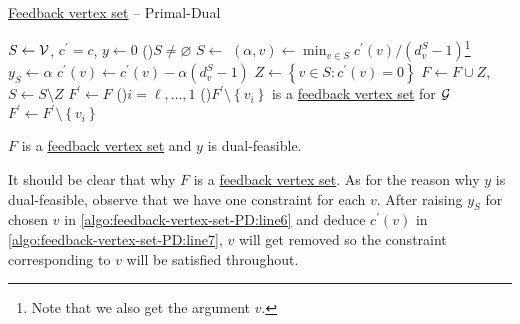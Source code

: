 \begin{algorithm}[H]\label{algo:feedback-vertex-set-PD}
	\DontPrintSemicolon
	\caption{\hyperref[prb:feedback-vertex-set]{Feedback vertex set} -- Primal-Dual}
	\BlankLine

	\(S\gets \mathcal{\MakeUppercase{v}} \), \(c^\prime = c\), \(y\gets 0\)
	\;
	\While(){\(S \neq \varnothing \)}{
		\(S\gets\) 
		\((\alpha, v) \gets \min _{v\in S} c^\prime (v) / (d_v^S - 1)\)\footnote{Note that we also get the argument \(v\).}
		\(y_S\gets \alpha\)\label{algo:feedback-vertex-set-PD:line6}\;
		\(c^\prime (v)\gets c^\prime (v) - \alpha (d_v^S - 1)\)\label{algo:feedback-vertex-set-PD:line7}\;
		\(Z\gets \left\{ v\in S\colon c^\prime (v) = 0 \right\} \)\;
		\(F\gets F\cup Z\), \(S\gets S \setminus Z\)\;
	}
	\;
	\(F^\prime \gets F\)
	\For(){\(i = \ell , \ldots  , 1\)}{
		\If(){\(F^\prime \setminus \left\{ v_i \right\}\) is a \hyperref[prb:feedback-vertex-set]{feedback vertex set} for \(\mathcal{\MakeUppercase{g}} \) }{
			\(F^\prime \gets F^\prime \setminus \left\{ v_i \right\} \)\;
		}
	}
	\;
\end{algorithm}

\begin{claim}
	\(F\) is a \hyperref[prb:feedback-vertex-set]{feedback vertex set} and \(y\) is dual-feasible.
\end{claim}
\begin{explanation}
	It should be clear that why \(F\) is a \hyperref[prb:feedback-vertex-set]{feedback vertex set}. As for the reason why \(y\) is dual-feasible, observe that we have one constraint for each \(v\). After raising \(y_S\) for chosen \(v\) in \autoref{algo:feedback-vertex-set-PD:line6} and deduce \(c^\prime (v)\) in \autoref{algo:feedback-vertex-set-PD:line7}, \(v\) will get removed so the constraint corresponding to \(v\) will be satisfied throughout.
\end{explanation}

